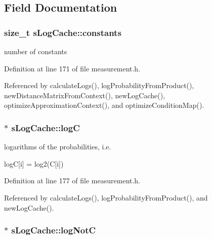 \subsection{\-Field \-Documentation}
\hypertarget{structsLogCache_a06855ad644ec7343d2952cb079d83cd1}{
\subsubsection[{constants}]{\setlength{\rightskip}{0pt plus 5cm}size\-\_\-t {\bf s\-Log\-Cache\-::constants}}}\label{structsLogCache_a06855ad644ec7343d2952cb079d83cd1}


number of constants 



\-Definition at line 171 of file measurement.\-h.



\-Referenced by calculate\-Logs(), log\-Probability\-From\-Product(), new\-Distance\-Matrix\-From\-Context(), new\-Log\-Cache(), optimize\-Approximation\-Context(), and optimize\-Condition\-Map().

\hypertarget{structsLogCache_ac1a2fe56f678e4b2be3b56f9b6c04163}{
\subsubsection[{log\-C}]{$\ast$ {\bf s\-Log\-Cache\-::log\-C}}}\label{structsLogCache_ac1a2fe56f678e4b2be3b56f9b6c04163}


logarithms of the probabilities, i.\-e. 

log\-C\mbox{[}i\mbox{]} = log2(\-C\mbox{[}i\mbox{]}) 

\-Definition at line 177 of file measurement.\-h.



\-Referenced by calculate\-Logs(), log\-Probability\-From\-Product(), and new\-Log\-Cache().

\hypertarget{structsLogCache_aa9bfdee3aa5ff16f6ef8e3bef6da8f9c}{
\subsubsection[{log\-Not\-C}]{$\ast$ {\bf s\-Log\-Cache\-::log\-Not\-C}}}\label{structsLogCache_aa9bfdee3aa5ff16f6ef8e3bef6da8f9c}



